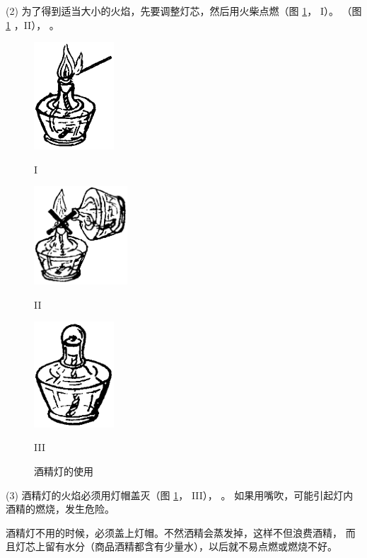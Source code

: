 (2) 为了得到适当大小的火焰，先要调整灯芯，然后用火柴点燃（图 \ref{fig:xssy-6}， I）。
（图 \ref{fig:xssy-6} ，II）， 。

\begin{figure}[htbp]
    \centering
    \begin{minipage}[b]{4cm}
        \centering
        \includegraphics[width=3cm]{../pic/czhx1-xssy-06-1}
        \caption*{I}
    \end{minipage}
    \qquad
    \begin{minipage}[b]{4cm}
        \centering
        \includegraphics[width=3.5cm]{../pic/czhx1-xssy-06-2}
        \caption*{II}
    \end{minipage}
    \qquad
    \begin{minipage}[b]{4cm}
        \centering
        \includegraphics[width=3cm]{../pic/czhx1-xssy-06-3}
        \caption*{III}
    \end{minipage}
    \caption{酒精灯的使用}\label{fig:xssy-6}
\end{figure}

(3) 酒精灯的火焰必须用灯帽盖灭（图 \ref{fig:xssy-6}， III）， 。
如果用嘴吹，可能引起灯内酒精的燃烧，发生危险。

酒精灯不用的时候，必须盖上灯帽。不然洒精会蒸发掉，这样不但浪费酒精，
而且灯芯上留有水分（商品酒精都含有少量水），以后就不易点燃或燃烧不好。

